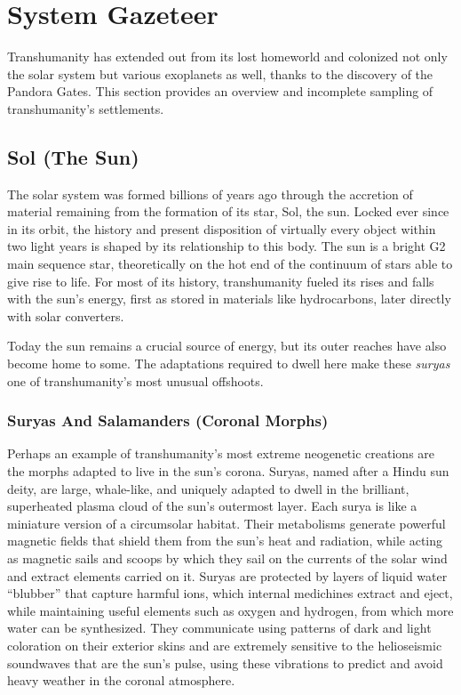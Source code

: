 \section{System Gazeteer}

Transhumanity has extended out from its lost homeworld
and colonized not only the solar system but various
exoplanets as well, thanks to the discovery of the
Pandora Gates. This section provides an overview and 
incomplete sampling of transhumanity's settlements.

\subsection{Sol (The Sun)}

The solar system was formed billions of years ago 
through the accretion of material remaining from the 
formation of its star, Sol, the sun. Locked ever since in 
its orbit, the history and present disposition of virtually
every object within two light years is shaped by
its relationship to this body. The sun is a bright G2 
main sequence star, theoretically on the hot end of the 
continuum of stars able to give rise to life. For most 
of its history, transhumanity fueled its rises and falls 
with the sun's energy, first as stored in materials like 
hydrocarbons, later directly with solar converters.

Today the sun remains a crucial source of energy, 
but its outer reaches have also become home to some. 
The adaptations required to dwell here make these 
\textit{suryas} one of transhumanity's most unusual offshoots.

\subsubsection{Suryas And Salamanders (Coronal Morphs)}

Perhaps an example of transhumanity's most extreme 
neogenetic creations are the morphs adapted to live 
in the sun's corona. Suryas, named after a Hindu sun 
deity, are large, whale-like, and uniquely adapted to 
dwell in the brilliant, superheated plasma cloud of the 
sun's outermost layer. Each surya is like a miniature 
version of a circumsolar habitat. Their metabolisms 
generate powerful magnetic fields that shield them 
from the sun's heat and radiation, while acting as 
magnetic sails and scoops by which they sail on the 
currents of the solar wind and extract elements carried 
on it. Suryas are protected by layers of liquid water 
``blubber'' that capture harmful ions, which internal 
medichines extract and eject, while maintaining useful 
elements such as oxygen and hydrogen, from which 
more water can be synthesized. They communicate 
using patterns of dark and light coloration on their 
exterior skins and are extremely sensitive to the helioseismic
soundwaves that are the sun's pulse, using
these vibrations to predict and avoid heavy weather in 
the coronal atmosphere.

